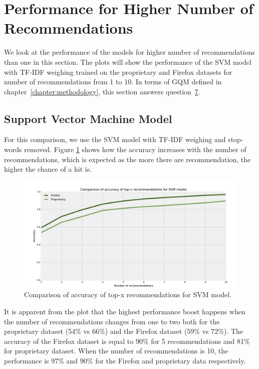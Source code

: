 \section{Performance for Higher Number of Recommendations}
\label{section:compare-number-of-recommendations}

We look at the performance of the models for higher number of recommendations than one in this section. The plots will show the performance of the SVM model with TF-IDF weighing trained on the proprietary and Firefox datasets for number of recommendations from 1 to 10. In terms of GQM defined in chapter~\ref{chapter:methodology}, this section answers question~\hyperlink{question:7}{7}.

\subsection{Support Vector Machine Model}

For this comparison, we use the SVM model with TF-IDF weighing and stop-words removed. Figure \ref{fig:results.topx.svm_accuracy} shows how the accuracy increases with the number of recommendations, which is expected as the more there are recommendation, the higher the chance of a hit is.

\begin{figure}[htbp]
    \centering
        \includegraphics[width=\textwidth]{./images/top_x_comparison/svm_accuracy.pdf}
    \caption{Comparison of accuracy of top-x recommendations for SVM model.}
    \label{fig:results.topx.svm_accuracy}
\end{figure}

It is apparent from the plot that the highest performance boost happens when the number of recommendations changes from one to two both for the proprietary dataset (54\% vs 66\%) and the Firefox dataset (59\% vs 72\%). The accuracy of the Firefox dataset is equal to 90\% for 5 recommendations and 81\% for proprietary dataset. When the number of recommendations is 10, the performance is 97\% and 90\% for the Firefox and proprietary data respectively.

